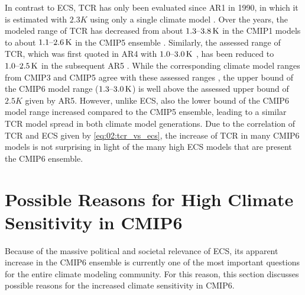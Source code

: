 In contrast to \ac{ECS}, \ac{TCR} has only been evaluated since \acs{AR}1 in
1990, in which it is estimated with $2.3 \unit{K}$ using only a single climate
model . Over the years, the modeled range
of \ac{TCR} has decreased from about $\range{1.3}{3.8} \unit{K}$ in the
\acs{CMIP}1 models \autocite{Kattenberg1996} to about $\range{1.1}{2.6}
\unit{K}$ in the \acs{CMIP}5 ensemble \autocite{Flato2013}. Similarly, the
assessed range of \ac{TCR}, which was first quoted in \acs{AR}4 with
$\range{1.0}{3.0} \unit{K}$ \autocite{Solomon2007}, has been reduced to
$\range{1.0}{2.5} \unit{K}$ in the subsequent \acs{AR}5 \autocite{Stocker2013}.
While the corresponding climate model ranges from \acs{CMIP}3 and \acs{CMIP}5
agree with these assessed ranges \autocite{Randall2007, Flato2013}, the upper
bound of the \acs{CMIP}6 model range ($\range{1.3}{3.0} \unit{K}$) is well
above the assessed upper bound of $2.5 \unit{K}$ given by \acs{AR}5. However,
unlike \ac{ECS}, also the lower bound of the \acs{CMIP}6 model range increased
compared to the \acs{CMIP}5 ensemble, leading to a similar \ac{TCR} model
spread in both climate model generations. Due to the correlation of \ac{TCR}
and \ac{ECS} given by \cref{eq:02:tcr_vs_ecs}, the increase of \ac{TCR} in many
\acs{CMIP}6 models is not surprising in light of the many high \ac{ECS} models
that are present the \acs{CMIP}6 ensemble.


\section{Possible Reasons for High Climate Sensitivity in \acs{CMIP}6}
\label{sec:04:possible_reasons_high_ecs_cmip6}

Because of the massive political and societal relevance of \ac{ECS}, its
apparent increase in the \ac{CMIP}6 ensemble is currently one of the most
important questions for the entire climate modeling community. For this reason,
this section discusses possible reasons for the increased climate sensitivity
in \acs{CMIP}6.

